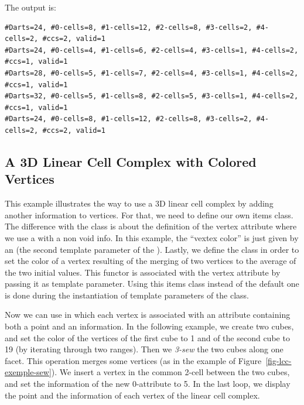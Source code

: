 
The output is:
\begin{verbatim}
#Darts=24, #0-cells=8, #1-cells=12, #2-cells=8, #3-cells=2, #4-cells=2, #ccs=2, valid=1
#Darts=24, #0-cells=4, #1-cells=6, #2-cells=4, #3-cells=1, #4-cells=2, #ccs=1, valid=1
#Darts=28, #0-cells=5, #1-cells=7, #2-cells=4, #3-cells=1, #4-cells=2, #ccs=1, valid=1
#Darts=32, #0-cells=5, #1-cells=8, #2-cells=5, #3-cells=1, #4-cells=2, #ccs=1, valid=1
#Darts=24, #0-cells=8, #1-cells=12, #2-cells=8, #3-cells=2, #4-cells=2, #ccs=2, valid=1
\end{verbatim}

\subsection{A 3D Linear Cell Complex with Colored Vertices}
\label{ssec-exemple-color-vertices}

This example illustrates the way to use a 3D linear cell complex by
adding another information to vertices. For that, we need to define
our own items class.  The difference with the
 class is about the definition of
the vertex attribute where we use a 
with a non void info. In this example, the ``vextex color'' is just
given by an  (the second template parameter of the
).  Lastly, we define the
 class in order to set the color of a vertex
resulting of the merging of two vertices to the average of the two
initial values. This functor is associated with the vertex attribute
by passing it as template parameter.  Using this items class instead of
the default one is done during the instantiation of template
parameters of the  class.

Now we can use  in which each vertex is associated with an
attribute containing both a point and an information. In the following
example, we create two cubes, and set the color of the vertices of the
first cube to 1 and of the second cube to 19 (by iterating through two
 ranges).  Then we
\emph{3-sew} the two cubes along one facet. This operation merges some
vertices (as in the example of Figure~\ref{fig-lcc-exemple-sew}).  We
insert a vertex in the common 2-cell between the two cubes, and set
the information of the new 0-attribute to 5.  In the last loop, we
display the point and the information of each vertex of the linear
cell complex.

